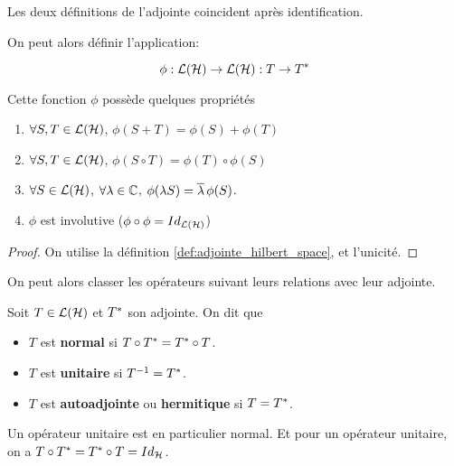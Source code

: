 \begin{proposition}
	Les deux définitions de l'adjointe coincident après identification.
\end{proposition}

On peut alors définir l'application:

\begin{equation}
	\phi : \mathcal{L}(\mathcal{H}) \rightarrow \mathcal{L}(\mathcal{H}) : T \rightarrow
	T^{*}
\end{equation}

Cette fonction $\phi$ possède quelques propriétés

\begin{proposition}
\begin{enumerate}
	\item $\forall S, T \in \mathcal{L}(\mathcal{H})$, $\phi(S + T) =
		\phi(S) + \phi(T)$
	\item $\forall S, T \in \mathcal{L}(\mathcal{H})$, $\phi(S \circ T) = \phi(T)
		\circ \phi(S)$
	\item $\forall S \in \mathcal{L}(\mathcal{H})$, $\forall \lambda \in
		\mathbb{C}$, $\phi(\lambda S) = \overline{\lambda} \, \phi(S)$.
	\item $\phi$ est involutive ($\phi \circ \phi =
		Id_{\mathcal{L}(\mathcal{H})}$)
\end{enumerate}
\end{proposition}

\begin{proof}
	On utilise la définition \ref{def:adjointe_hilbert_space}, et l'unicité.
\end{proof}

On peut alors classer les opérateurs suivant leurs relations avec leur adjointe.

\begin{definition}
	Soit $T \in \mathcal{L}(\mathcal{H})$ et $T^{*}$ son adjointe. On
	dit que
	\begin{itemize}
		\item $T$ est \textbf{normal} si $T \circ T^{*} = T^{*}
			\circ T$.
		\item $T$ est \textbf{unitaire} si $T^{-1} = T^{*}$.
		\item $T$ est \textbf{autoadjointe} ou \textbf{hermitique} si $T =
			T^{*}$.
	\end{itemize}
\end{definition}

\begin{remarque}
	Un opérateur unitaire est en particulier normal. Et pour un opérateur
	unitaire, on a $T \circ T^{*} = T^{*} \circ T =
	Id_{\mathcal{H}}$.
\end{remarque}

